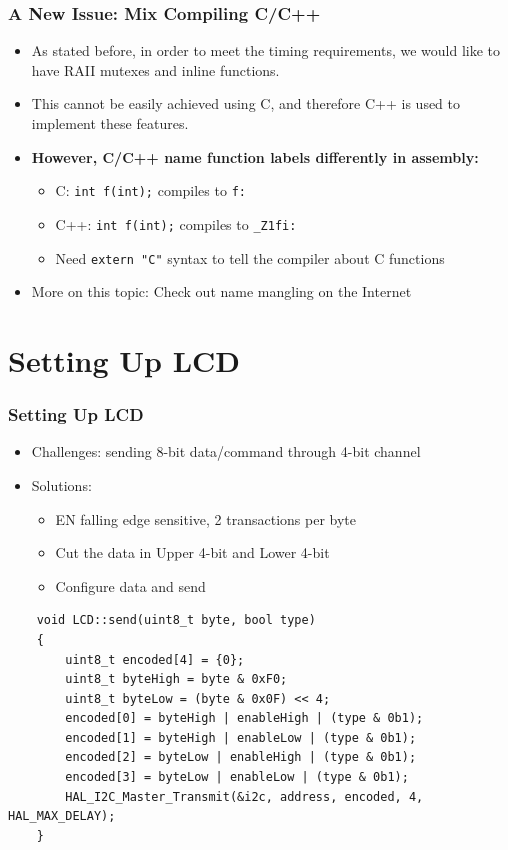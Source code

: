 \documentclass[12pt]{beamer}
\begin{document}
\begin{frame}[fragile]
    \frametitle{A New Issue: Mix Compiling C/C++}
    \begin{itemize}
        \item As stated before, in order to meet the timing requirements, we would like to have RAII mutexes and inline functions.
        \item This cannot be easily achieved using C, and therefore C++ is used to implement these features.
        \item \textbf{However, C/C++ name function labels differently in assembly:}
              \begin{itemize}
                  \item C: \verb|int f(int);| compiles to \verb|f:|
                  \item C++: \verb|int f(int);| compiles to \verb|_Z1fi:|
                  \item Need \verb|extern "C"| syntax to tell the compiler about C functions
              \end{itemize}
        \item More on this topic: Check out name mangling on the Internet
    \end{itemize}
\end{frame}

\section{Setting Up LCD}
\begin{frame}[fragile]
    \frametitle{Setting Up LCD}
    \begin{itemize}
        \item Challenges: sending 8-bit data/command through 4-bit channel
        \item Solutions:
              \begin{itemize}
                  \item EN falling edge sensitive, 2 transactions per byte
                  \item Cut the data in Upper 4-bit and Lower 4-bit
                  \item Configure data and send
              \end{itemize}
    \end{itemize}
    \scriptsize
    \begin{verbatim}
    void LCD::send(uint8_t byte, bool type)
    {
	    uint8_t encoded[4] = {0};
	    uint8_t byteHigh = byte & 0xF0;
	    uint8_t byteLow = (byte & 0x0F) << 4;
	    encoded[0] = byteHigh | enableHigh | (type & 0b1);
	    encoded[1] = byteHigh | enableLow | (type & 0b1);
	    encoded[2] = byteLow | enableHigh | (type & 0b1);
	    encoded[3] = byteLow | enableLow | (type & 0b1);
	    HAL_I2C_Master_Transmit(&i2c, address, encoded, 4, HAL_MAX_DELAY);
    }
    \end{verbatim}
\end{frame}
\end{document}
